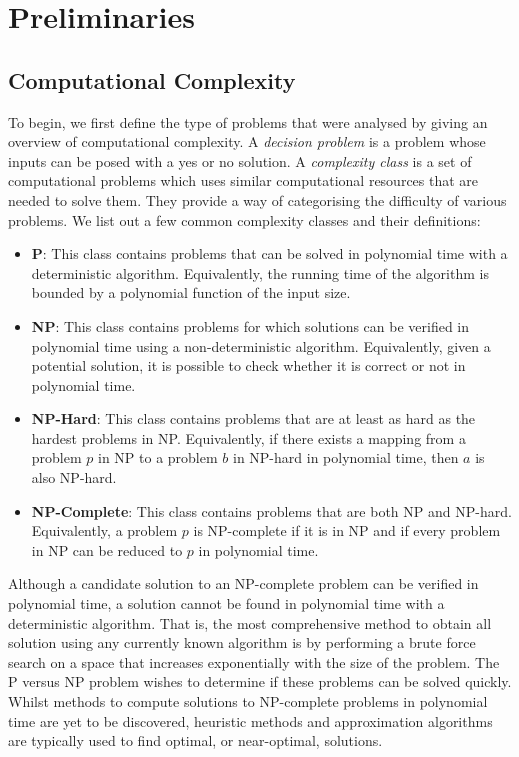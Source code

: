 \section{Preliminaries} \label{sec:prelim}

\subsection{Computational Complexity}

    To begin, we first define the type of problems that were analysed by giving an overview of computational complexity. A \emph{decision problem} is a problem whose inputs can be posed with a yes or no solution. A \emph{complexity class} is a set of computational problems which uses similar computational resources that are needed to solve them. They provide a way of categorising the difficulty of various problems. We list out a few common complexity classes and their definitions:
    \begin{itemize}
        \item \textbf{P}: This class contains problems that can be solved in polynomial time with a deterministic algorithm. Equivalently, the running time of the algorithm is bounded by a polynomial function of the input size.
        \item \textbf{NP}: This class contains problems for which solutions can be verified in polynomial time using a non-deterministic algorithm. Equivalently, given a potential solution, it is possible to check whether it is correct or not in polynomial time.
        \item \textbf{NP-Hard}: This class contains problems that are at least as hard as the hardest problems in NP. Equivalently, if there exists a mapping from a problem $p$ in NP to a problem $b$ in NP-hard in polynomial time, then $a$ is also NP-hard.
        \item \textbf{NP-Complete}: This class contains problems that are both NP and NP-hard. Equivalently, a problem $p$ is NP-complete if it is in NP and if every problem in NP can be reduced to $p$ in polynomial time.
        
    \end{itemize}

    Although a candidate solution to an NP-complete problem can be verified in polynomial time, a solution cannot be found in polynomial time with a deterministic algorithm. That is, the most comprehensive method to obtain all solution using any currently known algorithm is by performing a brute force search on a space that increases exponentially with the size of the problem. The P versus NP problem wishes to determine if these problems can be solved quickly. Whilst methods to compute solutions to NP-complete problems in polynomial time are yet to be discovered, heuristic methods and approximation algorithms are typically used to find optimal, or near-optimal, solutions.



